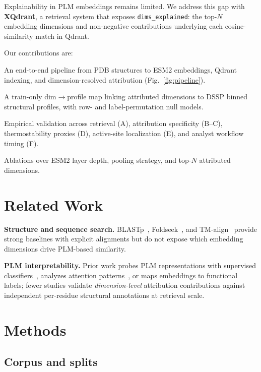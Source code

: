 \documentclass{ws-procs11x85}
\begin{document}
Explainability in PLM embeddings remains limited. We address this gap with \textbf{XQdrant}, a retrieval system that exposes \texttt{dims\_explained}: the top-$N$ embedding dimensions and non-negative contributions underlying each cosine-similarity match in Qdrant.

Our contributions are:
\begin{arabiclist}[(4)]
\item An end-to-end pipeline from PDB structures to ESM2 embeddings, Qdrant indexing, and dimension-resolved attribution (Fig.~\ref{fig:pipeline}).
\item A train-only dim$\rightarrow$profile map linking attributed dimensions to DSSP binned structural profiles, with row- and label-permutation null models.
\item Empirical validation across retrieval (A), attribution specificity (B--C), thermostability proxies (D), active-site localization (E), and analyst workflow timing (F).
\item Ablations over ESM2 layer depth, pooling strategy, and top-$N$ attributed dimensions.
\end{arabiclist}

\section{Related Work}

\textbf{Structure and sequence search.} BLASTp~\cite{altschul1997gapped}, Foldseek~\cite{van2022foldseek}, and TM-align~\cite{zhang2005tmalign} provide strong baselines with explicit alignments but do not expose which embedding dimensions drive PLM-based similarity.

\textbf{PLM interpretability.} Prior work probes PLM representations with supervised classifiers~\cite{tenney2019bert,bepler2019learning}, analyzes attention patterns~\cite{vig2020bertology,rao2021msat}, or maps embeddings to functional labels; fewer studies validate \emph{dimension-level} attribution contributions against independent per-residue structural annotations at retrieval scale.

\section{Methods}

\subsection{Corpus and splits}
\end{document}
